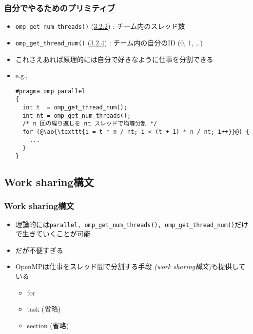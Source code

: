 \documentclass[10pt,dvipdfmx]{beamer}
\newcommand{\sectionompgetnumthreads}{\href{https://www.openmp.org/spec-html/5.1/openmpsu121.html\#x160-1930003.2.2}{3.2.2}}
\newcommand{\sectionompgetmaxthreads}{\href{https://www.openmp.org/spec-html/5.1/openmpsu122.html\#x161-1940003.2.3}{3.2.3}}
\newcommand{\sectionompgetthreadnum}{\href{https://www.openmp.org/spec-html/5.1/openmpsu123.html\#x162-1950003.2.4}{3.2.4}}
\newcommand{\ao}[1]{{\color{blue}#1}}
\begin{document}
\begin{frame}[fragile]
\frametitle{自分でやるためのプリミティブ}

\begin{itemize}
\item \ao{\tt omp\_get\_num\_threads()} 
(\sectionompgetnumthreads) : チーム内のスレッド数
\item \ao{\tt omp\_get\_thread\_num()} 
(\sectionompgetthreadnum) : チーム内の自分のID
  (0, 1, \ldots)

\item これさえあれば原理的には自分で好きなように仕事を分割できる

\item e.g.,
\begin{lstlisting}
#pragma omp parallel
{
  int t  = omp_get_thread_num();
  int nt = omp_get_num_threads();
  /* n 回の繰り返しを nt スレッドで均等分割 */
  for (@\ao{\texttt{i = t * n / nt; i < (t + 1) * n / nt; i++}}@) {
    ...
  }
}
\end{lstlisting}
\end{itemize}
\end{frame}

\subsection{Work sharing構文}


\begin{frame}[fragile]
\frametitle{Work sharing構文}
\begin{itemize}
\item 理論的には\ao{\tt parallel, omp\_get\_num\_threads(),
    omp\_get\_thread\_num()}だけで生きていくことが可能
\item だが不便すぎる
\item OpenMPは仕事をスレッド間で\ao{分割}する手段
  \ao{\em (work sharing構文)}も提供している
  \begin{itemize}
  \item \ao{for}
  \item task (省略)
  \item section (省略)
  \end{itemize}
\end{itemize}
\end{frame}
\end{document}
